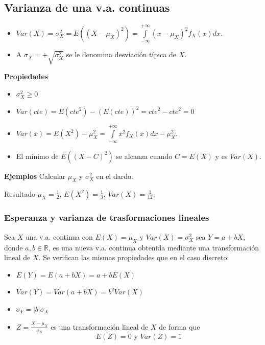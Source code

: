 \documentclass[handout]{beamer}\usepackage[]{graphicx}\usepackage[]{color}
\newcommand{\RR}{\mathbb{R}}
\renewcommand{\geq}{\geqslant}
\theoremstyle{plain}
\theoremstyle{definition}
\begin{document}
\subsection{Varianza  de una  v.a. continuas}

\begin{frame}
\begin{itemize}
\item $Var(X)=\sigma_{X}^{2}=E((X-\mu_{X})^2)=
\int\limits_{-\infty}^{+\infty} (x-\mu_{X})^2 f_{X}(x)dx.$
\item A $\sigma_{X}=+\sqrt{\sigma_{X}^{2}}$ se le denomina desviación típica  de $X$.
\end{itemize}
\end{frame}
\begin{frame}



\textbf{Propiedades}
\begin{itemize}
\item $\sigma_{X}^{2}\geq 0$
\item $Var(cte)=E(cte^2)-(E(cte))^2= cte^2 - cte^2=0$
\item $Var(x)=E(X^{2})-\mu_{X}^2=\int\limits_{-\infty}^{+\infty}x^2
f_{X}(x)dx - \mu_{X}^2.$
\item El mínimo de $E((X-C)^2)$ se alcanza cuando $C=E(X)$ y es $Var(X)$.
\end{itemize}
\end{frame}

\begin{frame}

\textbf{Ejemplos} Calcular $\mu_{X}$ y $\sigma_{X}^{2}$ en el dardo.

Resultado $\mu_{X}=\frac{1}{2}$, $E(X^2)=\frac{1}{3}$,
$Var(X)=\frac{1}{12}$.
\end{frame}
\subsubsection{Esperanza y varianza de trasformaciones lineales}


\begin{frame}
Sea $X$ una v.a. continua con $E(X)=\mu_{X}$ y $Var(X)=\sigma_{X}^{2}$ sea $Y=a+b X$, donde
$a,b\in\RR$, es una nueva v.a. continua obtenida mediante una transformación lineal de $X$.
Se verifican las mismas propiedades que en el caso discreto:
\begin{itemize}
\item  $E(Y)=E(a+b X)=a+b E(X)$
\item $Var(Y)=Var(a+b X)=b^{2} Var(X)$
\item $\sigma_{Y}=|b| \sigma_{X}$
\item $Z=\frac{X-\mu_{X}}{\sigma_{X}}$ es una transformación
lineal de $X$ de forma que
$$E(Z)=0 \mbox{ y } Var(Z)=1$$
\end{itemize}
\end{frame}
\end{document}
